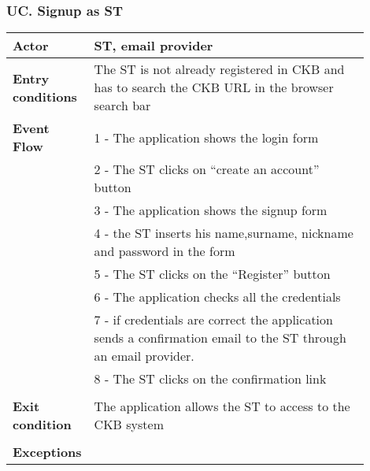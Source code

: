 \subsubsection*{UC\cuc . Signup as ST}
\begin{center}
    \begin{longtable}{|l|p{0.9\linewidth}|}
        \hline
        \textbf{Actor}            & ST, email provider                                                                                                                                                                                      \\
        \hline
        \textbf{Entry conditions} & The ST is not already registered in CKB and has to search the CKB URL in the browser search bar                                                                                                                   \\
        \hline
        \textbf{Event Flow}       & 1 - The application shows the login form  \\
        & 2 - The ST clicks on “create an account” button  \\
        & 3 - The application shows the signup form  \\
        & 4 - the ST inserts his name,surname, nickname and password in the form  \\
        & 5 - The ST clicks on the “Register” button  \\
        & 6 - The application checks all the credentials  \\
        & 7 - if credentials are correct the application sends a confirmation email to the ST through an email provider.  \\
        & 8 - The ST clicks on the confirmation link                                                                        \\                                                                                                                                                                    \\
        \hline
        \textbf{Exit condition}   & The application allows the ST to access to the CKB system \\                                                                                                                                                                                \\
        \hline
        \textbf{Exceptions}       & \begin{itemize}

\end{itemize}
\end{longtable}
\end{center}
